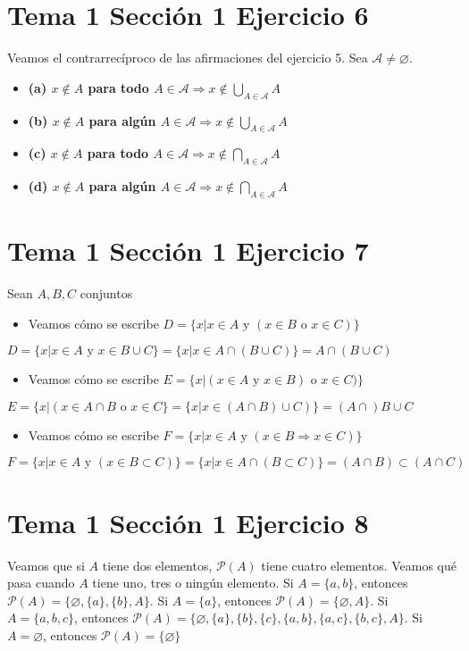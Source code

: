 \documentclass{article}
\begin{document}
\section{Tema 1 Sección 1 Ejercicio 6}
Veamos el contrarrecíproco de las afirmaciones del ejercicio 5.
Sea $\mathcal{A}\neq \varnothing$. 
\begin{itemize}
\item \bf (a) \rm $x\notin A$ para todo  $A\in \mathcal{A} \Rightarrow x\notin \bigcup_{A\in \mathcal{A}}A$
\end{itemize}
\begin{itemize}
\item \bf (b) \rm $x\notin A$ para algún $A\in \mathcal{A} \Rightarrow x\notin \bigcup_{A\in \mathcal{A}}A$
\end{itemize}
\begin{itemize}
\item \bf (c) \rm $x\notin A$ para todo $A\in \mathcal{A} \Rightarrow x\notin \bigcap_{A\in \mathcal{A}}A$
\end{itemize}
\begin{itemize}
\item \bf (d) \rm $x\notin A$ para algún $A\in \mathcal{A} \Rightarrow x\notin \bigcap_{A\in \mathcal{A}}A$
\end{itemize}
\section{Tema 1 Sección 1 Ejercicio 7}
Sean $A,B,C$ conjuntos
\begin{itemize}
\item Veamos cómo se escribe $D=\{x| x\in A \text{ y }(x\in B \text{ o } x\in C)\}$
\end{itemize}
$D=\{x| x\in A \text{ y }x\in B \cup C\}= \{x|x\in A\cap (B\cup C)\}=A\cap (B\cup C)$
\begin{itemize}
\item Veamos cómo se escribe $E=\{x| (x\in A \text{ y }x\in B) \text{ o } x\in C)\}$
\end{itemize}
$E=\{x|( x\in A\cap B \text{ o }x\in C\}= \{x|x\in (A\cap B)\cup C)\}=(A\cap )B\cup C$
\begin{itemize}
\item Veamos cómo se escribe $F=\{x| x\in A \text{ y }(x\in B \Rightarrow x\in C)\}$
\end{itemize}
$F=\{x| x\in A \text{ y }(x\in B \subset C)\}= \{x|x\in A\cap (B\subset C)\}=(A\cap B)\subset (A\cap C)$
\section{Tema 1 Sección 1 Ejercicio 8}
Veamos que si $A$ tiene dos elementos, $\mathcal{P}(A)$ tiene cuatro elementos. Veamos qué pasa cuando $A$ tiene uno, tres o ningún elemento.
Si $A=\{a,b\}$, entonces $\mathcal{P}(A)=\{\varnothing, \{a\},\{b\},A\}$. Si $A=\{a\}$, entonces $\mathcal{P}(A)=\{\varnothing, A\}$. Si $A=\{a,b,c\}$, entonces $\mathcal{P}(A)=\{\varnothing, \{a\},\{b\}, \{c\},\{a,b\},\{a,c\},\{b,c\},A\}$. Si $A=\varnothing$, entonces $\mathcal{P}(A)=\{\varnothing\}$
\end{document}
